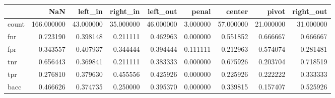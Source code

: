 \begin{tabular}{lrrrrrrrr}
\toprule
{} &         NaN &    left\_in &   right\_in &   left\_out &     penal &     center &      pivot &  right\_out \\
\midrule
count &  166.000000 &  43.000000 &  35.000000 &  46.000000 &  3.000000 &  57.000000 &  21.000000 &  31.000000 \\
fnr   &    0.723190 &   0.398148 &   0.211111 &   0.462963 &  0.000000 &   0.551852 &   0.666667 &   0.666667 \\
fpr   &    0.343557 &   0.407937 &   0.344444 &   0.394444 &  0.111111 &   0.212963 &   0.574074 &   0.281481 \\
tnr   &    0.656443 &   0.369841 &   0.211111 &   0.383333 &  0.000000 &   0.675926 &   0.203704 &   0.718519 \\
tpr   &    0.276810 &   0.379630 &   0.455556 &   0.425926 &  0.000000 &   0.225926 &   0.222222 &   0.333333 \\
bacc  &    0.466626 &   0.374735 &   0.250000 &   0.395370 &  0.000000 &   0.339815 &   0.157407 &   0.525926 \\
\bottomrule
\end{tabular}

